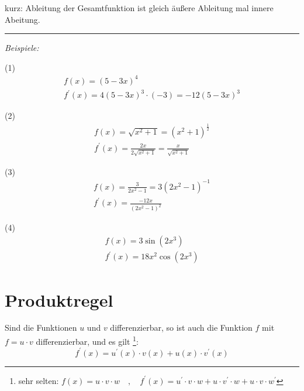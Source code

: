kurz: \glqq Ableitung der Gesamtfunktion ist gleich äußere Ableitung mal innere Abeitung.\grqq{}

\noindent\rule{\textwidth}{1pt}

\textit{Beispiele:}

(1)
\begin{equation*}
    \begin{gathered}
        f(x)  = (5-3x)^4 \\
        f^{\prime}(x)  = 4(5-3x)^3 \cdot (-3) = -12(5-3x)^3
    \end{gathered}
\end{equation*}

(2)
\begin{equation*}
    \begin{gathered}
        f(x)  = \sqrt{x^2 + 1} = (x^2 + 1)^\frac{1}{2} \\
        f^{\prime}(x)  = \frac{2x}{2\sqrt{x^2 + 1}} = \frac{x}{\sqrt{x^2 + 1}}
    \end{gathered}
\end{equation*}

(3)
\begin{equation*}
    \begin{gathered}
        f(x)  = \frac{3}{2x^2 - 1} = 3(2x^2 - 1)^{-1} \\
        f^{\prime}(x)  = \frac{-12x}{(2x^2 - 1)^2}
    \end{gathered}
\end{equation*}

(4)
\begin{equation*}
    \begin{gathered}
        f(x)  = 3\sin(2x^3) \\
        f^{\prime}(x)  = 18x^2\cos(2x^3)
    \end{gathered}
\end{equation*}

\section{Produktregel}

\begin{satz}
Sind die Funktionen $u$ und $v$ differenzierbar, so ist auch die Funktion $f$ mit $f = u \cdot v$ differenzierbar, und es gilt \footnote{sehr selten: $f(x) = u\cdot v\cdot w \quad , \quad f^\prime(x) = u^\prime \cdot v \cdot w + u \cdot v^\prime \cdot w + u \cdot v \cdot w^\prime$}:
$$f^\prime(x) = u^\prime(x) \cdot v(x) + u(x) \cdot v^\prime(x)$$
\end{satz}

